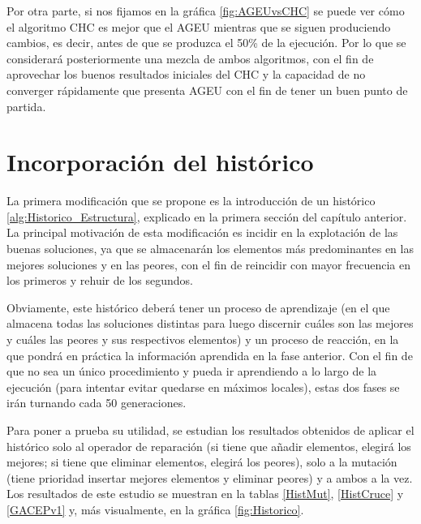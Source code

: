 Por otra parte, si nos fijamos en la gráfica \ref{fig:AGEUvsCHC} se puede ver cómo el algoritmo CHC es mejor que el AGEU mientras que se siguen produciendo cambios, es decir, antes de que se produzca el 50\% de la ejecución. 
Por lo que se considerará posteriormente una mezcla de ambos algoritmos, con el fin de aprovechar los buenos resultados iniciales del CHC y la capacidad de no converger rápidamente que presenta AGEU con el fin de tener un buen punto de partida.

\section{Incorporación del histórico}

La primera modificación que se propone es la introducción de un histórico \ref{alg:Historico_Estructura}, explicado en la primera sección del capítulo anterior. 
La principal motivación de esta modificación es incidir en la explotación de las buenas soluciones, ya que se almacenarán los elementos más predominantes en las mejores soluciones y en las peores, con el fin de reincidir con mayor frecuencia en los primeros y rehuir de los segundos. 

Obviamente, este histórico deberá tener un proceso de aprendizaje (en el que almacena todas las soluciones distintas para luego discernir cuáles son las mejores y cuáles las peores y sus respectivos elementos) y un proceso de reacción, en la que pondrá en práctica la información aprendida en la fase anterior. 
Con el fin de que no sea un único procedimiento y pueda ir aprendiendo a lo largo de la ejecución (para intentar evitar quedarse en máximos locales), estas dos fases se irán turnando cada 50 generaciones. 

Para poner a prueba su utilidad, se estudian los resultados obtenidos de aplicar el histórico solo al operador de reparación (si tiene que añadir elementos, elegirá los mejores; si tiene que eliminar elementos, elegirá los peores), solo a la mutación (tiene prioridad insertar mejores elementos y eliminar peores) y a ambos a la vez. 
Los resultados de este estudio se muestran en la tablas \ref{HistMut}, \ref{HistCruce} y \ref{GACEPv1} y, más visualmente, en la gráfica \ref{fig:Historico}.

